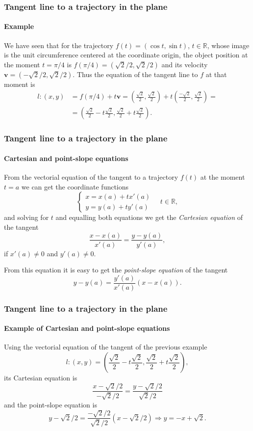 \begin{frame}
\frametitle{Tangent line to a trajectory in the plane}
\framesubtitle{Example}
We have seen that for the trajectory $f(t) = (\cos t,\sin t)$, $t\in \mathbb{R}$, whose image is the unit circumference centered at the coordinate origin, the object position at the moment $t=\pi/4$ is $f(\pi/4)=(\sqrt{2}/2,\sqrt{2}/2)$ and its velocity $\mathbf{v}=(-\sqrt{2}/2,\sqrt{2}/2)$. 
Thus the equation of the tangent line to $f$ at that moment is 
\[
\begin{align*}
l: (x,y) & = f(\pi/4)+t\mathbf{v} =
\left(\frac{\sqrt{2}}{2},\frac{\sqrt{2}}{2}\right)+t\left(\frac{-\sqrt{2}}{2},\frac{\sqrt{2}}{2}\right) =\\
& =\left(\frac{\sqrt{2}}{2}-t\frac{\sqrt{2}}{2},\frac{\sqrt{2}}{2}+t\frac{\sqrt{2}}{2}\right).
\end{align*}
\]
\end{frame}


\begin{frame}
\frametitle{Tangent line to a trajectory in the plane}
\framesubtitle{Cartesian and point-slope equations}
From the vectorial equation of the tangent to a trajectory $f(t)$ at the moment $t=a$ we can get the coordinate functions
\[
\begin{cases}
x=x(a)+tx'(a)\\
y=y(a)+ty'(a)
\end{cases}
\quad t\in \mathbb{R},
\]
and solving for $t$ and equalling both equations we get the \emph{Cartesian equation} of the tangent
\[
\frac{x-x(a)}{x'(a)}=\frac{y-y(a)}{y'(a)},
\]
if $x'(a)\neq 0$ and $y'(a)\neq 0$.

From this equation it is easy to get the \emph{point-slope equation} of the tangent
\[
y-y(a)=\frac{y'(a)}{x'(a)}(x-x(a)).
\]
\end{frame}


\begin{frame}
\frametitle{Tangent line to a trajectory in the plane}
\framesubtitle{Example of Cartesian and point-slope equations}
Using the vectorial equation of the tangent of the previous example
\[
l: (x,y)=\left(\frac{\sqrt{2}}{2}-t\frac{\sqrt{2}}{2},\frac{\sqrt{2}}{2}+t\frac{\sqrt{2}}{2}\right),
\]
its Cartesian equation is 
\[
\frac{x-\sqrt{2}/2}{-\sqrt{2}/2} = \frac{y-\sqrt{2}/2}{\sqrt{2}/2}
\]
and the point-slope equation is 
\[
y-\sqrt{2}/2 = \frac{-\sqrt{2}/2}{\sqrt{2}/2}(x-\sqrt{2}/2) \Rightarrow y=-x+\sqrt{2}.
\]
\end{frame}


